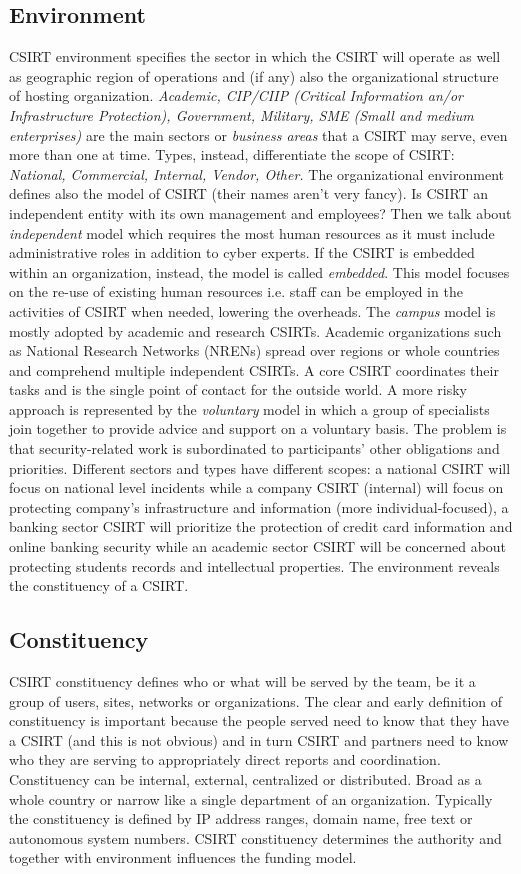 \subsection{Environment}
CSIRT environment specifies the sector in which the CSIRT will operate as well as geographic region of operations and (if any) also the organizational structure of hosting organization. \textit{Academic, CIP/CIIP (Critical Information an/or Infrastructure Protection), Government, Military, SME (Small and medium enterprises)} are the main sectors or \textit{business areas} that a CSIRT may serve, even more than one at time. Types, instead, differentiate the scope of CSIRT: \textit{National, Commercial, Internal, Vendor, Other.} The organizational environment defines also the model of CSIRT (their names aren't very fancy). Is CSIRT an independent entity with its own management and employees? Then we talk about \textit{independent} model which requires the most human resources as it must include administrative roles in addition to cyber experts. If the CSIRT is embedded within an organization, instead, the model is called \textit{embedded}. This model focuses on the re-use of existing human resources i.e. staff can be employed in the activities of CSIRT when needed, lowering the overheads. The \textit{campus} model is mostly adopted by academic and research CSIRTs. Academic organizations such as National Research Networks (NRENs) spread over regions or whole countries and comprehend multiple independent CSIRTs. A core CSIRT coordinates their tasks and is the single point of contact for the outside world. A more risky approach is represented by the \textit{voluntary} model in which a group of specialists join together to provide advice and support on a voluntary basis. The problem is that security-related work is subordinated to participants' other obligations and priorities. Different sectors and types have different scopes: a national CSIRT will focus on national level incidents while a company CSIRT (internal) will focus on protecting company's infrastructure and information (more individual-focused), a banking sector CSIRT will prioritize the protection of credit card information and online banking security while an academic sector CSIRT will be concerned about protecting students records and intellectual properties. The environment reveals the constituency of a CSIRT.
\subsection{Constituency}
CSIRT constituency defines who or what will be served by the team, be it a group of users, sites, networks or organizations. The clear and early definition of constituency is important because the people served need to know that they have a CSIRT (and this is not obvious) and in turn CSIRT and partners need to know who they are serving to appropriately direct reports and coordination. Constituency can be internal, external, centralized or distributed. Broad as a whole country or narrow like a single department of an organization. Typically the constituency is defined by IP address ranges, domain name, free text or autonomous system numbers. CSIRT constituency determines the authority and together with environment influences the funding model.
